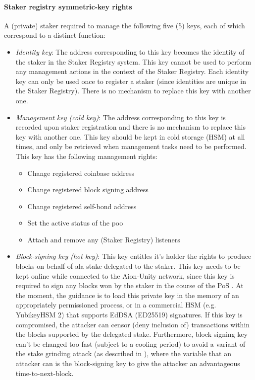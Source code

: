 \paragraph{Staker registry symmetric-key rights} \label{km_staker} A  (private) staker required to manage the following five (5) keys, each of which correspond to a distinct function: 
\begin{itemize}
    \item \textit{Identity key}: The address corresponding to this key becomes the identity of the staker in the Staker Registry system. This key cannot be used to perform any management actions in the context of the Staker Registry. Each identity key can only be used once to register a staker (since identities are unique in the Staker Registry). There is no mechanism to replace this key with another one.
    
    \item \textit{Management key (cold key)}: The address corresponding to this key is recorded upon staker registration and there is no mechanism to replace this key with another one. This key should be kept in cold storage (HSM) at all times, and only be retrieved when management tasks need to be performed. This key has the following management rights:
    \begin{itemize} [label=--,nosep]
        \item Change registered coinbase address
        \item Change registered block signing address
        \item Change registered self-bond address
        \item Set the active status of the poo
        \item Attach and remove any (Staker Registry) listeners 
    \end{itemize}
    
    \item \textit{Block-signing key (hot key)}: This key entitles it's holder the rights to produce blocks on behalf of ala stake delegated to the staker. This key needs to be kept online while connected to the Aion-Unity network, since this key is required to sign any blocks won by the staker in the course of the PoS . At the moment, the guidance is to load this private key in the memory of an appropriately permissioned process, or in a commercial HSM (e.g. YubikeyHSM 2) that supports EdDSA (ED25519) signatures. If this key is compromised, the attacker can censor (deny inclusion of) transactions within the blocks supported by the delegated stake. Furthermore, block signing key can't be changed too fast (subject to a cooling period) to avoid a variant of the stake grinding attack (as described in \cite{WZS19}), where the variable that an attacker can  is the block-signing key to give the attacker an advantageous time-to-next-block. 
    

\end{itemize}
